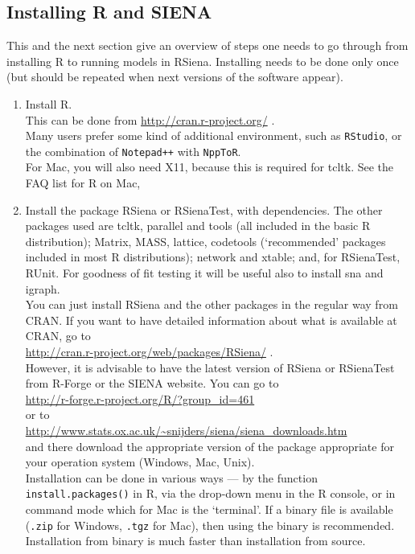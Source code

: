 \documentclass[a4paper,fleqn,11pt]{article}
\newcommand{\+}{\, + \,}
\newcommand{\sfn}[1]{\textsf{#1}}
\newcommand{\R}{{\sf R }}
\newcommand{\Rn}{{\sf R}}
\newcommand{\rs}{{\sf RSiena}}
\newcommand{\RS}{{\sf RSiena }}
\newcommand{\SI}{{\sf SIENA }}
\begin{document}
\subsection{Installing \R and \SI }
\label{S_use}
\noindent
This and the next section give an overview of steps one needs to go through from
installing \R to running models in \rs.
Installing needs to be done only once (but should be repeated when next versions
of the software appear).

\begin{enumerate}
	\item	Install \Rn.\\
            This can be done from \url{http://cran.r-project.org/} .\\
            Many users prefer some kind of additional environment, such as \texttt{RStudio}, or
            the combination of \texttt{Notepad++} with \texttt{NppToR}.\\
            For Mac, you will also need \sfn{X11}, because this is
            required for \sfn{tcltk}. See the FAQ list for R on Mac,
	\item	Install the package \RS or \sfn{RSienaTest}, with dependencies.
            The other packages used are \sfn{tcltk}, \sfn{parallel}
            and \sfn{tools} (all included in the basic \R distribution);
            \sfn{Matrix}, \sfn{MASS}, \sfn{lattice}, \sfn{codetools}
            (`recommended' packages included in most R distributions);
            \sfn{network} and \sfn{xtable}; and, for \sfn{RSienaTest},
            \sfn{RUnit}.
            For goodness of fit testing it will be useful also to
            install \sfn{sna} and \sfn{igraph}.\\
            You can just install \RS and the other packages
            in the regular way from CRAN.
            If you want to have detailed information about
            what is available at CRAN, go to\\
\url{http://cran.r-project.org/web/packages/RSiena/} .\\
            However, it is advisable to have the latest version of \RS
            or \sfn{RSienaTest} from R-Forge or the \SI website.
            You can go to\\
               \url{http://r-forge.r-project.org/R/?group_id=461} \\
               or to\\
              \url{http://www.stats.ox.ac.uk/~snijders/siena/siena_downloads.htm}\\
            and there download the appropriate version of the package
            appropriate for your operation system (Windows, Mac, Unix). \\
            Installation can be done in various ways --- by the function \texttt{install.packages()}
            in \Rn,
            via the drop-down menu in the \R console, or in command mode which for Mac is
            the `terminal'.
            If a binary file is available (\texttt{.zip} for Windows, \texttt{.tgz} for Mac),
            then using the binary is recommended.
            Installation from binary is much faster than installation from source.


\end{enumerate}
\end{document}

